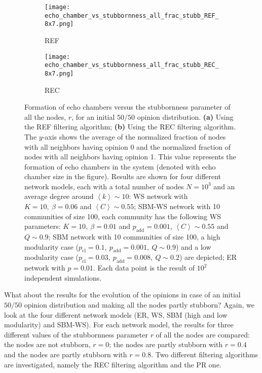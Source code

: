 \documentclass[11 pt , letterpaper , twoside , openright]{book}
\begin{document}
\begin{figure}[H]
  \begin{subfigure}[b]{0.49\textwidth}
  	\texttt{[image: echo\_chamber\_vs\_stubbornness\_all\_frac\_stubb\_REF\_8x7.png]}
    \caption{REF}
    \label{REF_all_frac_stubb}
  \end{subfigure}
  \begin{subfigure}[b]{0.49\textwidth}
  	\texttt{[image: echo\_chamber\_vs\_stubbornness\_all\_frac\_stubb\_REC\_8x7.png]}
    \caption{REC}
    \label{REC_all_frac_stubb}
  \end{subfigure}
  \captionsetup{format=plain}
  \caption[Formation of echo chambers versus the stubbornness parameter of all the nodes, $r$, for the REF and REC filtering algorithms and an initial $50/50$ opinion distribution.]{Formation of echo chambers versus the stubbornness parameter of all the nodes, $r$, for an initial $50/50$ opinion distribution. \textbf{(a)} Using the REF filtering algorithm; \textbf{(b)} Using the REC filtering algorithm. The $y$-axis shows the average of the normalized fraction of nodes with all neighbors having opinion 0 and the normalized fraction of nodes with all neighbors having opinion 1. This value represents the formation of echo chambers in the system (denoted with echo chamber size in the figure). Results are shown for four different network models, each with a total number of nodes $N=10^3$ and an average degree around $\left<k\right> \sim 10$: WS network with $K =10,\ \beta = 0.06$ and $\left<C\right> \sim 0.55$; SBM-WS network with 10 communities of size 100, each community has the following WS parameters: $K = 10,\ \beta = 0.01$ and $p_{\text{add}} = 0.001$, $\left<C\right> \sim 0.55$ and $Q \sim 0.9$; SBM network with 10 communities of size 100, a high modularity case ($p_{\text{cl}} = 0.1,\ p_{\text{add}} = 0.001,\ Q \sim 0.9$) and a low modularity case ($p_{\text{cl}} = 0.03,\ p_{\text{add}} = 0.008,\ Q \sim 0.2$) are depicted; ER network with $p= 0.01$. Each data point is the result of $10^2$ independent simulations.}
\label{echo_vs_all_frac_stubb_REF-REC}
\end{figure}
\noindent
What about the results for the evolution of the opinions in case of an initial $50/50$ opinion distribution and making all the nodes partly stubborn? Again, we look at the four different network models (ER, WS, SBM (high and low modularity) and SBM-WS). For each network model, the results for three different values of the stubbornness parameter $r$ of all the nodes are compared: the nodes are not stubborn, $r=0$; the nodes are partly stubborn with $r = 0.4$ and the nodes are partly stubborn with $r=0.8$. Two different filtering algorithms are investigated, namely the REC filtering algorithm and the PR one.\\
\end{document}
